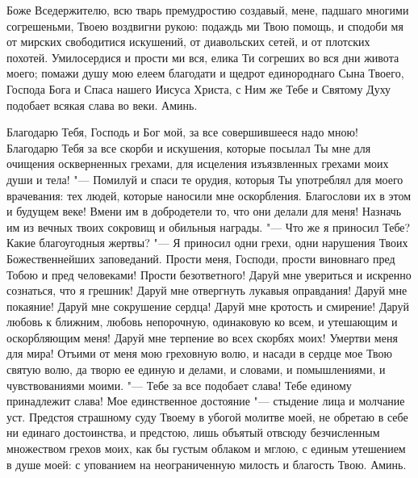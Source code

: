 \mychapterending

\begin{mymulticols}
 

Боже Вседержителю, всю тварь премудростию создавый, мене, падшаго многими согрешеньми, Твоею воздвигни рукою: подаждь ми Твою помощь, и сподоби мя от мирских свободитися искушений, от диавольских сетей, и от плотских похотей. Умилосердися и прости ми вся, елика Ти согреших во вся дни живота моего; помажи душу мою елеем благодати и щедрот единороднаго Сына Твоего, Господа Бога и Спаса нашего Иисуса Христа, с Ним же Тебе и Святому Духу подобает всякая слава во веки. Аминь.

\end{mymulticols}

\mychapterending

\begin{mymulticols}
 

Благодарю Тебя, Господь и Бог мой, за все совершившееся надо мною! Благодарю Тебя за все скорби и искушения, которые посылал Ты мне для очищения оскверненных грехами, для исцеления изъязвленных грехами моих души и тела! "--- Помилуй и спаси те орудия, которыя Ты употреблял для моего врачевания: тех людей, которые наносили мне оскорбления. Благослови их в этом и будущем веке! Вмени им в добродетели то, что они делали для меня! Назначь им из вечных твоих сокровищ и обильныя награды. "--- Что же я приносил Тебе? Какие благоугодныя жертвы? "--- Я приносил одни грехи, одни нарушения Твоих Божественнейших заповеданий. Прости меня, Господи, прости виновнаго пред Тобою и пред человеками! Прости безответного! Даруй мне увериться и искренно сознаться, что я грешник! Даруй мне отвергнуть лукавыя оправдания! Даруй мне покаяние! Даруй мне сокрушение сердца! Даруй мне кротость и смирение! Даруй любовь к ближним, любовь непорочную, одинаковую ко всем, и утешающим и оскорбляющим меня! Даруй мне терпение во всех скорбях моих! Умертви меня для мира! Отъими от меня мою греховную волю, и насади в сердце мое Твою святую волю, да творю ее единую и делами, и словами, и помышлениями, и чувствованиями моими. "--- Тебе за все подобает слава! Тебе единому принадлежит слава! Мое единственное достояние "--- стыдение лица и молчание уст. Предстоя страшному суду Твоему в убогой молитве моей, не обретаю в себе ни единаго достоинства, и предстою, лишь объятый отвсюду безчисленным множеством грехов моих, как бы густым облаком и мглою, с единым утешением в душе моей: с упованием на неограниченную милость и благость Твою. Аминь.

\end{mymulticols}

\mychapterending


